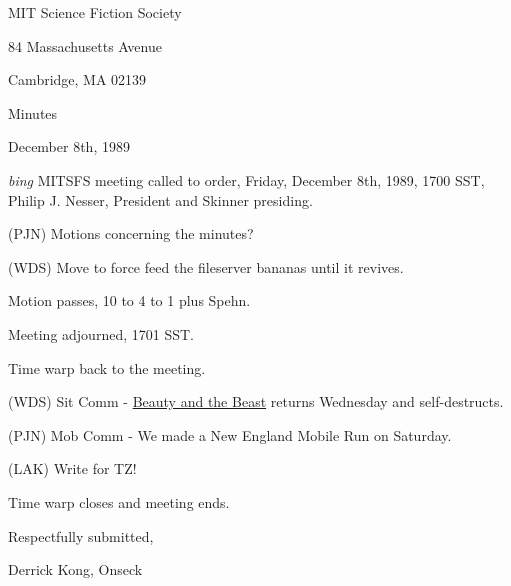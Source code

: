 \setlength{\topmargin}{-0.5in}
\setlength{\oddsidemargin}{-0.60in}
\setlength{\textheight}{9in}
\setlength{\textwidth}{6.5in}



\begin{center}
MIT Science Fiction Society

84 Massachusetts Avenue

Cambridge, MA 02139

\vspace{0.2in}
Minutes

December 8th, 1989

\end{center}
 
\vspace{0.15in}
{\em bing\/}  MITSFS meeting called to order, Friday, December 8th, 1989,
1700 SST, Philip J. Nesser, President and Skinner presiding.

(PJN) Motions concerning the minutes?

(WDS) Move to force feed the fileserver bananas until it revives.

Motion passes, 10 to 4 to 1 plus Spehn.

Meeting adjourned, 1701 SST.

Time warp back to the meeting.

(WDS) Sit Comm - \underline{Beauty and the Beast} returns Wednesday
and self-destructs. 

(PJN) Mob Comm - We made a New England Mobile Run on Saturday.

(LAK) Write for TZ!

Time warp closes and meeting ends.

\vspace{0.15in}
\begin{center}
Respectfully submitted,

Derrick Kong, Onseck
\end{center}

